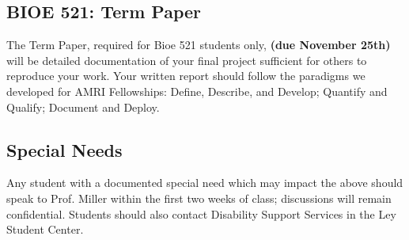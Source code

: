 \documentclass[10pt]{article}
\begin{document}
\subsection*{BIOE 521: Term Paper}
The Term Paper, required for Bioe 521 students only, \textbf{(due November 25th)} will be detailed documentation of your final project sufficient for others to reproduce your work. Your written report should follow the paradigms we developed for AMRI Fellowships: Define, Describe, and Develop; Quantify and Qualify; Document and Deploy.

\subsection*{Special Needs}
Any student with a documented special need which may impact the above should speak to Prof. Miller within the first two weeks of class; discussions will remain confidential. Students should also contact Disability Support Services in the Ley Student Center.
\end{document}
